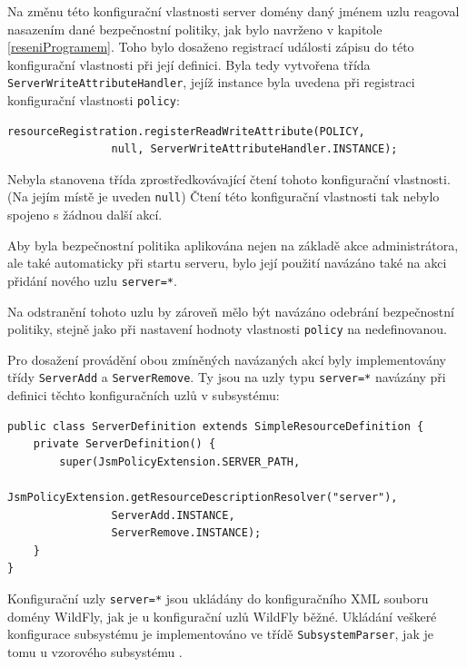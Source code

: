 Na změnu této konfigurační vlastnosti server domény daný jménem uzlu reagoval nasazením dané bezpečnostní politiky, jak bylo navrženo v kapitole \ref{reseniProgramem}.
Toho bylo dosaženo registrací události zápisu do této konfigurační vlastnosti při její definici.
Byla tedy vytvořena třída {\tt ServerWriteAttributeHandler}, jejíž instance byla uvedena při registraci konfigurační vlastnosti {\tt policy}:

\begin{lstlisting}[caption=Registrace konfigurační vlastnosti {\tt policy} uzlu {\tt server=*}, label=registraceAtributu]
resourceRegistration.registerReadWriteAttribute(POLICY,
                null, ServerWriteAttributeHandler.INSTANCE);
\end{lstlisting}

Nebyla stanovena třída zprostředkovávající čtení tohoto konfigurační vlastnosti. (Na jejím místě je uveden {\tt null}) Čtení této konfigurační vlastnosti tak nebylo spojeno s žádnou další akcí.

Aby byla bezpečnostní politika aplikována nejen na základě akce administrátora, ale také automaticky při startu serveru, bylo její použití navázáno také na akci přidání nového uzlu {\tt server=*}.

Na odstranění tohoto uzlu by zároveň mělo být navázáno odebrání bezpečnostní politiky, stejně jako při nastavení hodnoty vlastnosti {\tt policy} na nedefinovanou.

Pro dosažení provádění obou zmíněných navázaných akcí byly implementovány třídy {\tt ServerAdd} a {\tt ServerRemove}.
Ty jsou na uzly typu {\tt server=*} navázány při definici těchto konfiguračních uzlů v subsystému:

\begin{lstlisting}[caption=Definice konfiguračního uzlu {\tt server=*}, label=registraceUzluServer]
public class ServerDefinition extends SimpleResourceDefinition {
    private ServerDefinition() {
        super(JsmPolicyExtension.SERVER_PATH,
                JsmPolicyExtension.getResourceDescriptionResolver("server"),
                ServerAdd.INSTANCE,
                ServerRemove.INSTANCE);
    }
}
\end{lstlisting}

Konfigurační uzly {\tt server=*} jsou ukládány do konfiguračního XML souboru domény WildFly, jak je u konfigurační uzlů WildFly běžné.
Ukládání veškeré konfigurace subsystému je implementováno ve třídě {\tt SubsystemParser}, jak je tomu u vzorového subsystému \cite{WildFlyExtending}.

